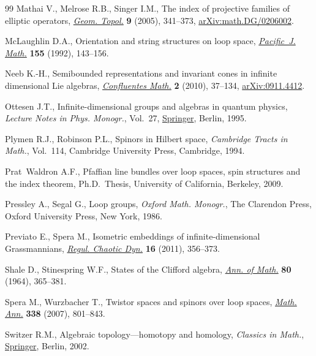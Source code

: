 \documentclass[11pt]{article}
\numberwithin{equation}{section}
\numberwithin{equation}{section}
\begin{document}
\begin{thebibliography}{99}
Mathai V., Melrose R.B., Singer I.M., The index of projective families of
 elliptic operators,  \href{https://doi.org/10.2140/gt.2005.9.341}{\textit{Geom. Topol.}} \textbf{9} (2005), 341--373,
 \href{https://arxiv.org/abs/math.DG/0206002}{arXiv:math.DG/0206002}.

McLaughlin D.A., Orientation and string structures on loop space,
 \href{https://doi.org/10.2140/pjm.1992.155.143}{\textit{Pacific~J. Math.}} \textbf{155} (1992), 143--156.

Neeb K.-H., Semibounded representations and invariant cones in infinite
 dimensional {L}ie algebras, \href{https://doi.org/10.1142/S1793744210000132}{\textit{Confluentes Math.}} \textbf{2} (2010),
 37--134, \href{https://arxiv.org/abs/0911.4412}{arXiv:0911.4412}.

Ottesen J.T., Infinite-dimensional groups and algebras in quantum physics,
 \textit{Lecture Notes in Phys. Monogr.}, Vol.~27,  \href{https://doi.org/10.1007/978-3-540-49141-5}{Springer}, Berlin, 1995.

Plymen R.J., Robinson P.L., Spinors in {H}ilbert space, \textit{Cambridge
 Tracts in Math.}, Vol.~114, Cambridge University Press, Cambridge, 1994.

Prat~Waldron A.F., Pfaffian line bundles over loop spaces, spin structures and
 the index theorem, Ph.D.~Thesis, {U}niversity of {C}alifornia, {B}erkeley,
 2009.

Pressley A., Segal G., Loop groups, \textit{Oxford Math. Monogr.}, The Clarendon Press,
 Oxford University Press, New York, 1986.

Previato E., Spera M., Isometric embeddings of infinite-dimensional
 {G}rassmannians, \href{https://doi.org/10.1134/S1560354711030099}{\textit{Regul. Chaotic Dyn.}} \textbf{16} (2011), 356--373.

Shale D., Stinespring W.F., States of the {C}lifford algebra, \href{https://doi.org/10.2307/1970397}{\textit{Ann. of
 Math.}} \textbf{80} (1964), 365--381.

Spera M., Wurzbacher T., Twistor spaces and spinors over loop spaces,
  \href{https://doi.org/10.1007/s00208-007-0085-3}{\textit{Math. Ann.}} \textbf{338} (2007), 801--843.

Switzer R.M., Algebraic topology---homotopy and homology, \textit{Classics in Math.},
  \href{https://doi.org/10.1007/978-3-642-61923-6}{Springer}, Berlin, 2002.


\end{thebibliography}
\end{document}
